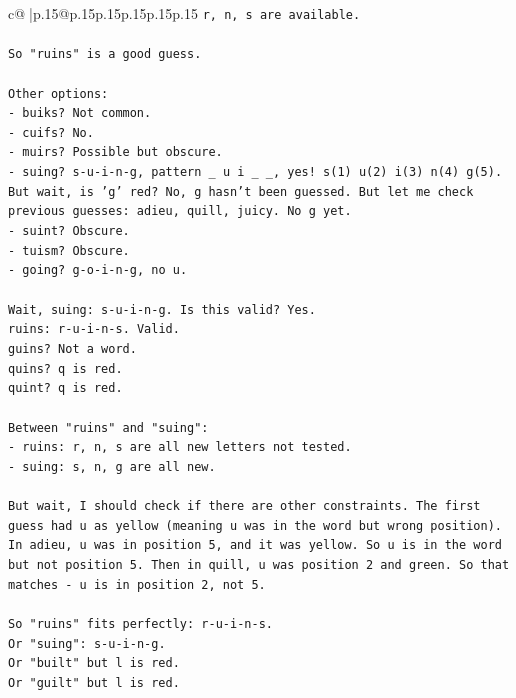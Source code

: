 \documentclass{article}
\begin{document}
{\begin{supertabular}{c@{$\;$}|p{.15\linewidth}@{}p{.15\linewidth}p{.15\linewidth}p{.15\linewidth}p{.15\linewidth}p{.15\linewidth}}
{{{\texttt{r, n, s are available.} \\
\\ 
\texttt{So "ruins" is a good guess.} \\
\\ 
\texttt{Other options:} \\
\texttt{{-} buiks? Not common.} \\
\texttt{{-} cuifs? No.} \\
\texttt{{-} muirs? Possible but obscure.} \\
\texttt{{-} suing? s{-}u{-}i{-}n{-}g, pattern \_ u i \_ \_, yes! s(1) u(2) i(3) n(4) g(5). But wait, is 'g' red? No, g hasn't been guessed. But let me check previous guesses: adieu, quill, juicy. No g yet.} \\
\texttt{{-} suint? Obscure.} \\
\texttt{{-} tuism? Obscure.} \\
\texttt{{-} going? g{-}o{-}i{-}n{-}g, no u.} \\
\\ 
\texttt{Wait, suing: s{-}u{-}i{-}n{-}g. Is this valid? Yes.} \\
\texttt{ruins: r{-}u{-}i{-}n{-}s. Valid.} \\
\texttt{guins? Not a word.} \\
\texttt{quins? q is red.} \\
\texttt{quint? q is red.} \\
\\ 
\texttt{Between "ruins" and "suing":} \\
\texttt{{-} ruins: r, n, s are all new letters not tested.} \\
\texttt{{-} suing: s, n, g are all new.} \\
\\ 
\texttt{But wait, I should check if there are other constraints. The first guess had u as yellow (meaning u was in the word but wrong position). In adieu, u was in position 5, and it was yellow. So u is in the word but not position 5. Then in quill, u was position 2 and green. So that matches {-} u is in position 2, not 5.} \\
\\ 
\texttt{So "ruins" fits perfectly: r{-}u{-}i{-}n{-}s.} \\
\texttt{Or "suing": s{-}u{-}i{-}n{-}g.} \\
\texttt{Or "built" but l is red.} \\
\texttt{Or "guilt" but l is red.} \\
\\ 
}}}
\end{supertabular}}
\end{document}
